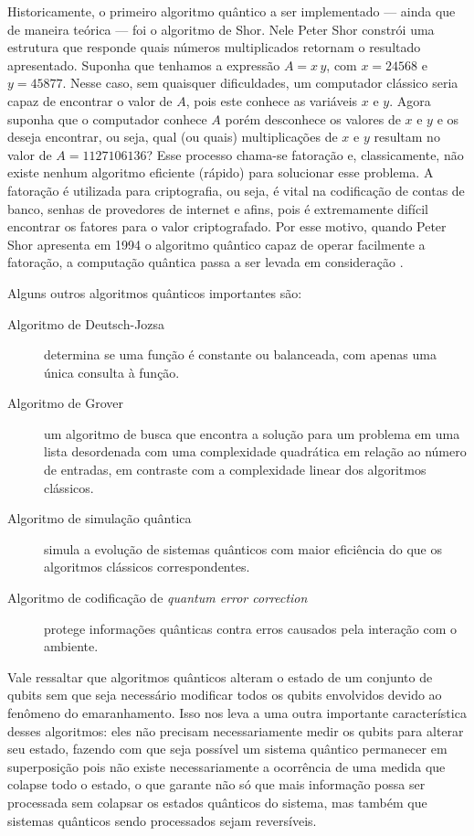 Historicamente, o primeiro algoritmo quântico a ser implementado --- ainda que de maneira teórica --- foi o algoritmo de Shor. Nele Peter Shor constrói uma estrutura que responde quais números multiplicados retornam o resultado apresentado. Suponha que tenhamos a expressão $A = x \, y$, com $x = \num{24568}$ e $y = \num{45877}$. Nesse caso, sem quaisquer dificuldades, um computador clássico seria capaz de encontrar o valor de $A$, pois este conhece as variáveis $x$ e $y$. Agora suponha que o computador conhece $A$ porém desconhece os valores de $x$ e $y$ e os deseja encontrar, ou seja, qual (ou quais) multiplicações de $x$ e $y$ resultam no valor de $A = \num{1127106136}$? Esse processo chama-se fatoração e, classicamente, não existe nenhum algoritmo eficiente (rápido) para solucionar esse problema. A fatoração é utilizada para criptografia, ou seja, é vital na codificação de contas de banco, senhas de provedores de internet e afins, pois é extremamente difícil encontrar os fatores para o valor criptografado. Por esse motivo, quando Peter Shor apresenta em 1994 o algoritmo quântico capaz de operar facilmente a fatoração, a computação quântica passa a ser levada em consideração \cite{videoyoutube2}.

Alguns outros algoritmos quânticos importantes são:

\begin{description}
  \item[Algoritmo de Deutsch-Jozsa] determina se uma função é constante ou balanceada, com apenas uma única consulta à função.
  \item[Algoritmo de Grover] um algoritmo de busca que encontra a solução para um problema em uma lista desordenada com uma complexidade quadrática em relação ao número de entradas, em contraste com a complexidade linear dos algoritmos clássicos.
  \item[Algoritmo de simulação quântica] simula a evolução de sistemas quânticos com maior eficiência do que os algoritmos clássicos correspondentes.
  \item[Algoritmo de codificação de \textit{quantum error correction}] protege informações quânticas contra erros causados pela interação com o ambiente.
\end{description}

Vale ressaltar que algoritmos quânticos alteram o estado de um conjunto de qubits sem que seja necessário modificar todos os qubits envolvidos devido ao fenômeno do emaranhamento. Isso nos leva a uma outra importante característica desses algoritmos: eles não precisam necessariamente medir os qubits para alterar seu estado, fazendo com que seja possível um sistema quântico permanecer em superposição pois não existe necessariamente a ocorrência de uma medida que colapse todo o estado, o que garante não só que mais informação possa ser processada sem colapsar os estados quânticos do sistema, mas também que sistemas quânticos sendo processados sejam reversíveis.


